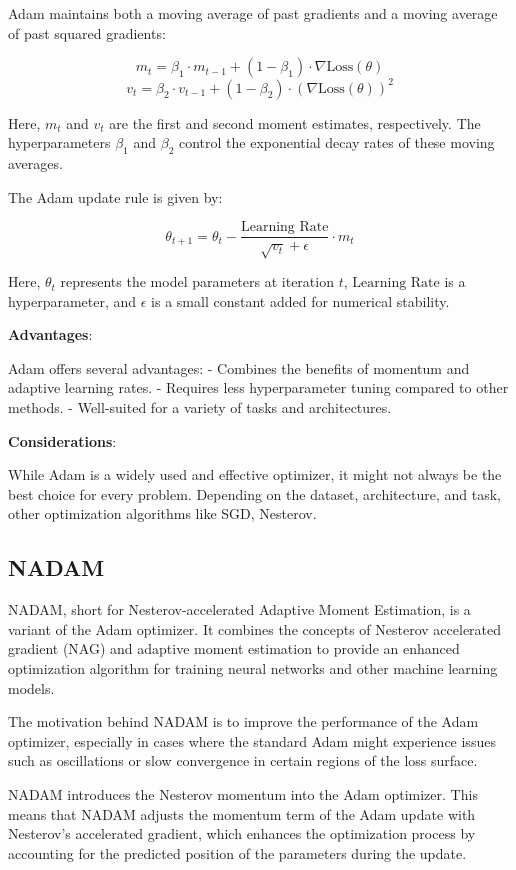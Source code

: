 \documentclass{report}
\begin{document}
Adam maintains both a moving average of past gradients and a moving average of past squared gradients:

\[ m_t = \beta_1 \cdot m_{t-1} + (1 - \beta_1) \cdot \nabla \text{Loss}(\theta) \]
\[ v_t = \beta_2 \cdot v_{t-1} + (1 - \beta_2) \cdot (\nabla \text{Loss}(\theta))^2 \]

Here, \(m_t\) and \(v_t\) are the first and second moment estimates, respectively. The hyperparameters \(\beta_1\) and \(\beta_2\) control the exponential decay rates of these moving averages.

The Adam update rule is given by:

\[ \theta_{t+1} = \theta_t - \frac{\text{Learning Rate}}{\sqrt{v_t} + \epsilon} \cdot m_t \]

Here, \(\theta_t\) represents the model parameters at iteration \(t\), \(\text{Learning Rate}\) is a hyperparameter, and \(\epsilon\) is a small constant added for numerical stability.

\textbf{Advantages}:

Adam offers several advantages:
- Combines the benefits of momentum and adaptive learning rates.
- Requires less hyperparameter tuning compared to other methods.
- Well-suited for a variety of tasks and architectures.

\textbf{Considerations}:

While Adam is a widely used and effective optimizer, it might not always be the best choice for every problem. Depending on the dataset, architecture, and task, other optimization algorithms like SGD, Nesterov.

\subsection{NADAM}
NADAM, short for Nesterov-accelerated Adaptive Moment Estimation, is a variant of the Adam optimizer. It combines the concepts of Nesterov accelerated gradient (NAG) and adaptive moment estimation to provide an enhanced optimization algorithm for training neural networks and other machine learning models.

The motivation behind NADAM is to improve the performance of the Adam optimizer, especially in cases where the standard Adam might experience issues such as oscillations or slow convergence in certain regions of the loss surface.

NADAM introduces the Nesterov momentum into the Adam optimizer. This means that NADAM adjusts the momentum term of the Adam update with Nesterov's accelerated gradient, which enhances the optimization process by accounting for the predicted position of the parameters during the update.
\end{document}
